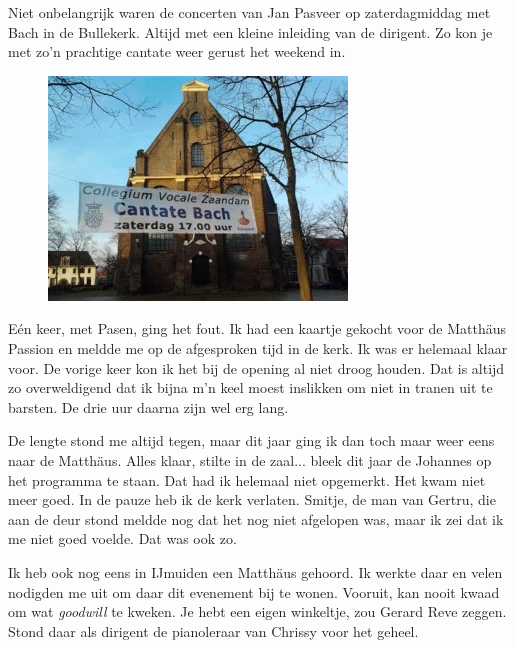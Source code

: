 \documentclass[10pt,twoside, openright]{memoir}
\begin{document}
Niet onbelangrijk waren de concerten van Jan Pasveer op zaterdagmiddag met Bach in de Bullekerk. Altijd met een kleine inleiding van de dirigent. Zo kon je met zo’n prachtige cantate weer gerust het weekend in.

\begin{figure}
\includegraphics[width=\textwidth]{img/ch31/Spandoek-cantate-klein}
\end{figure}

Eén keer, met Pasen, ging het fout. Ik had een kaartje gekocht voor de Matthäus Passion en meldde me op de afgesproken tijd in de kerk. Ik was er helemaal klaar voor. De vorige keer kon ik het bij de opening al niet droog houden. Dat is altijd zo overweldigend dat ik bijna m’n keel moest inslikken om niet in tranen uit te barsten. De drie uur daarna zijn wel erg lang. 

De lengte stond me altijd tegen, maar dit jaar ging ik dan toch maar weer eens naar de Matthäus. Alles klaar, stilte in de zaal... bleek dit jaar de Johannes op het programma te staan. Dat had ik helemaal niet opgemerkt. Het kwam niet meer goed. In de pauze heb ik de kerk verlaten. Smitje, de man van Gertru, die aan de deur stond meldde nog dat het nog niet afgelopen was, maar ik zei dat ik me niet goed voelde. Dat was ook zo.


Ik heb ook nog eens in IJmuiden een Matthäus gehoord. Ik werkte daar en velen nodigden me uit om daar dit evenement bij te wonen. Vooruit, kan nooit kwaad om wat \emph{goodwill} te kweken. Je hebt een eigen winkeltje, zou Gerard Reve zeggen. Stond daar als dirigent de pianoleraar van Chrissy voor het geheel. 
\end{document}
